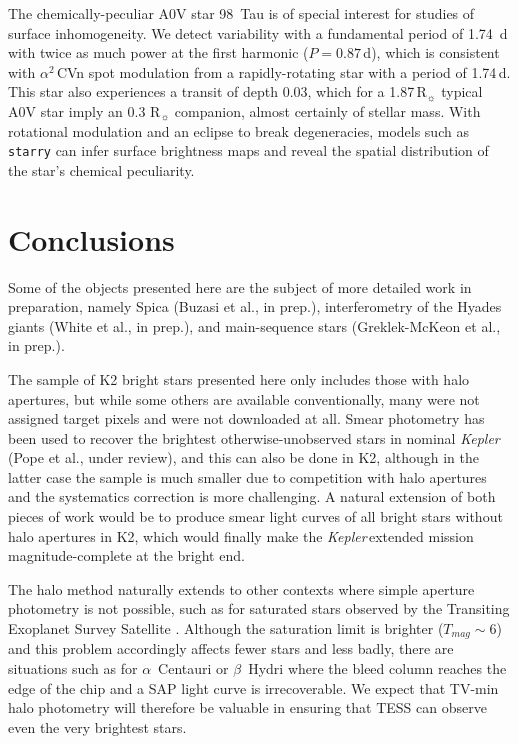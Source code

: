 \documentclass[modern]{aastex62}
\newcommand{\rsun}{\mbox{$\mathrm{R}_{\sun}$}\xspace}
\newcommand\kepler{\emph{Kepler}\,}
\begin{document}
The chemically-peculiar A0V star 98~Tau is of special interest for studies of surface inhomogeneity. We detect variability with a fundamental period of 1.74~d with twice as much power at the first harmonic ($P = 0.87$\,d), which is consistent with $\alpha^2$\,CVn spot modulation from a rapidly-rotating star with a period of 1.74\,d. This star also experiences a transit of depth 0.03, which for a 1.87\,\rsun typical A0V star imply an 0.3 \rsun companion, almost certainly of stellar mass. With rotational modulation and an eclipse to break degeneracies, models such as \texttt{starry} \citep{starry} can infer surface brightness maps and reveal the spatial distribution of the star's chemical peculiarity. 

\section{Conclusions}
\label{sec:conclusions}


Some of the objects presented here are the subject of more detailed work in preparation, namely Spica (Buzasi et al., in prep.), interferometry of the Hyades giants (White et al., in prep.), and main-sequence stars (Greklek-McKeon et al., in prep.). 

The sample of K2 bright stars presented here only includes those with halo apertures, but while some others are available conventionally, many were not assigned target pixels and were not downloaded at all. Smear photometry has been used to recover the brightest otherwise-unobserved stars in nominal \kepler (Pope et al., under review), and this can also be done in K2, although in the latter case the sample is much smaller due to competition with halo apertures and the systematics correction is more challenging. A natural extension of both pieces of work would be to produce smear light curves of all bright stars without halo apertures in K2, which would finally make the \kepler extended mission magnitude-complete at the bright end. 

The halo method naturally extends to other contexts where simple aperture photometry is not possible, such as for saturated stars observed by the Transiting Exoplanet Survey Satellite \citep[TESS;][]{tess}. Although the saturation limit is brighter ($T_{mag} \sim 6$) and this problem accordingly affects fewer stars and less badly, there are situations such as for $\alpha$~Centauri or $\beta$~Hydri where the bleed column reaches the edge of the chip and a SAP light curve is irrecoverable. We expect that TV-min halo photometry will therefore be valuable in ensuring that TESS can observe even the very brightest stars.
\end{document}
